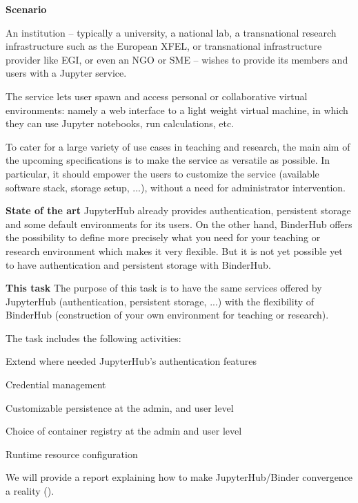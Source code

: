 \begin{task}[
  title=JupyterHub / BinderHub convergence,
  id=jh-bh-conv,
  lead=EP,
  PM=16, %
  wphases={0-36},
  partners={WTT}]

  \textbf{Scenario}

  An institution -- typically a university, a national lab, a transnational
  research infrastructure such as the European XFEL, or transnational
  infrastructure provider like EGI, or even an NGO or SME -- wishes to provide its members and
  users with a Jupyter service.

  The service lets user spawn and access personal or collaborative virtual
  environments: namely a web interface to a light weight virtual machine,
  in which they can use Jupyter notebooks, run calculations, etc.

  To cater for a large variety of use cases in teaching and research,
  the main aim of the upcoming specifications is to make the service as
  versatile as possible. In particular, it should empower the users to 
  customize the service (available software stack, storage setup, ...),
  without a need for administrator intervention.

  \textbf{State of the art}
  JupyterHub already provides authentication, persistent storage and some
  default environments for its users. On the other hand, BinderHub offers
  the possibility to define more precisely what you need for your teaching
  or research environment which makes it very flexible. But
  it is not yet possible yet to have authentication and persistent storage with
  BinderHub.

  \textbf{This task}
  The purpose of this task is to have the same services offered by JupyterHub
  (authentication, persistent storage, ...) with the flexibility of BinderHub
  (construction of your own environment for teaching or research).

  The task includes the following activities:
  \begin{compactitem}
  \item Extend where needed JupyterHub's authentication features%
  \item Credential management
  \item Customizable persistence at the admin, and user level
  \item Choice of container registry at the admin and user level %
  \item Runtime resource configuration %
  \end{compactitem}
  We will provide a report explaining how to make JupyterHub/Binder convergence a reality ().
\end{task}
